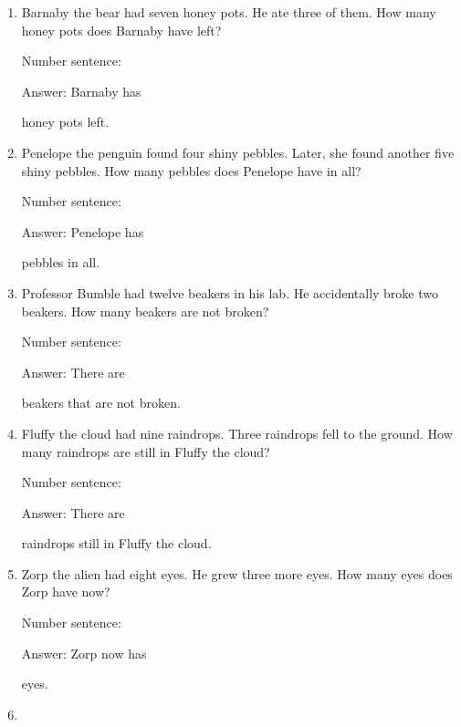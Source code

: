 \documentclass{tufte-book}
\begin{document}
\begin{enumerate}

\item
  Barnaby the bear had seven honey pots. He ate three of them. How many
  honey pots does Barnaby have left?\medskip\par
  Number sentence:
  \dotfill\medskip\par
  Answer: Barnaby has
  \dotfill\medskip\par\mbox{}\dotfill\medskip\par\mbox{}\dotfill\bigskip
  honey pots left.
\item
  Penelope the penguin found four shiny pebbles. Later, she found
  another five shiny pebbles. How many pebbles does Penelope have in
  all?\medskip\par
  Number sentence:
  \dotfill\medskip\par
  Answer: Penelope has
  \dotfill\medskip\par\mbox{}\dotfill\medskip\par\mbox{}\dotfill\bigskip
  pebbles in all.
\item
  Professor Bumble had twelve beakers in his lab. He accidentally broke
  two beakers. How many beakers are not broken?\medskip\par
  Number sentence:
  \dotfill\medskip\par
  Answer: There are
  \dotfill\medskip\par\mbox{}\dotfill\medskip\par\mbox{}\dotfill\bigskip
  beakers that are not broken.
\item
  Fluffy the cloud had nine raindrops. Three raindrops fell to the
  ground. How many raindrops are still in Fluffy the cloud?\medskip\par
  Number sentence:
  \dotfill\medskip\par
  Answer: There are
  \dotfill\medskip\par\mbox{}\dotfill\medskip\par\mbox{}\dotfill\bigskip
  raindrops still in Fluffy the cloud.
\item
  Zorp the alien had eight eyes. He grew three more eyes. How many eyes
  does Zorp have now?\medskip\par
  Number sentence:
  \dotfill\medskip\par
  Answer: Zorp now has
  \dotfill\medskip\par\mbox{}\dotfill\medskip\par\mbox{}\dotfill\bigskip
  eyes.
\item

\end{enumerate}
\end{document}

